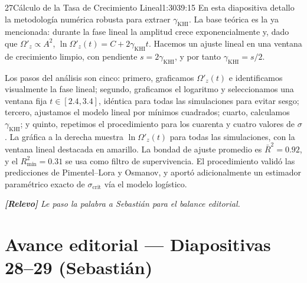 \documentclass[11pt,a4paper]{article}
\newcommand{\relevo}[1]{%
  \par\medskip
  \noindent\colorbox{tagbg}{\parbox{\dimexpr\linewidth-2\fboxsep\relax}{%
    \small\itshape \textbf{[Relevo]} #1}}\par\medskip}
\begin{document}
\begin{bryorador}{27}{Cálculo de la Tasa de Crecimiento Lineal}{1:30}{39:15}
En esta diapositiva detallo la metodología numérica robusta para extraer
$\gamma_\text{KHI}$. La base teórica es la ya mencionada: durante la fase
lineal la amplitud crece exponencialmente y, dado que $\Omega'_z\propto A^2$,
$\ln\Omega'_z(t)=C+2\gamma_\text{KHI}t$. Hacemos un ajuste lineal en una
ventana de crecimiento limpio, con pendiente $s=2\gamma_\text{KHI}$, y por
tanto $\gamma_\text{KHI}=s/2$.

Los pasos del análisis son cinco: primero, graficamos $\Omega'_z(t)$ e
identificamos visualmente la fase lineal; segundo, graficamos el logaritmo y
seleccionamos una ventana fija $t\in[2.4,3.4]$, idéntica para todas las
simulaciones para evitar sesgo; tercero, ajustamos el modelo lineal por
mínimos cuadrados; cuarto, calculamos $\gamma_\text{KHI}$; y quinto,
repetimos el procedimiento para los cuarenta y cuatro valores de $\sigma$. La
gráfica a la derecha muestra $\ln\Omega'_z(t)$ para todas las simulaciones,
con la ventana lineal destacada en amarillo. La bondad de ajuste promedio es
$\bar R^2=0.92$, y el $R^2_\text{mín}=0.31$ se usa como filtro de
supervivencia. El procedimiento validó las predicciones de Pimentel--Lora y
Osmanov, y aportó adicionalmente un estimador paramétrico exacto de
$\sigma_\text{crit}$ vía el modelo logístico.
\relevo{Le paso la palabra a Sebastián para el balance editorial.}
\end{bryorador}

\section{Avance editorial --- Diapositivas 28--29 (Sebastián)}
\end{document}
